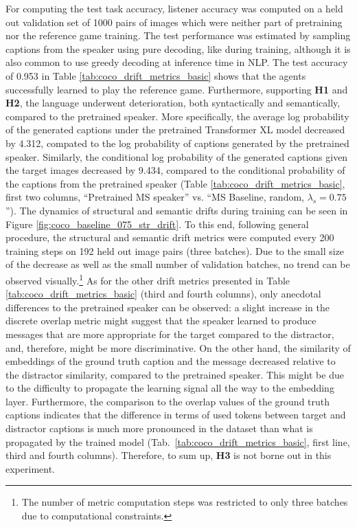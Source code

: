 For computing the test task accuracy, listener accuracy was computed on a held out validation set of 1000 pairs of images which were neither part of pretraining nor the reference game training. The test performance was estimated by sampling captions from the speaker using pure decoding, like during training, although it is also common to use greedy decoding at inference time in NLP. The test accuracy of 0.953 in Table \ref{tab:coco_drift_metrics_basic} shows that the agents successfully learned to play the reference game. Furthermore, supporting \textbf{H1} and \textbf{H2}, the language underwent deterioration, both syntactically and semantically, compared to the pretrained speaker. More specifically, the average log probability of the generated captions under the pretrained Transformer XL model decreased by 4.312, compated to the log probability of captions generated by the pretrained speaker. Similarly, the conditional log probability of the generated captions given the target images decreased by 9.434, compared to the conditional probability of the captions from the pretrained speaker (Table \ref{tab:coco_drift_metrics_basic}, first two columns, ``Pretrained MS speaker'' vs. ``MS Baseline, random, $\lambda_s=0.75$''). The dynamics of structural and semantic drifts during training can be seen in Figure \ref{fig:coco_baseline_075_str_drift}. To this end, following general procedure, the structural and semantic drift metrics were computed every 200 training steps on 192 held out image pairs (three batches). Due to the small size of the decrease as well as the small number of validation batches, no trend can be observed visually.\footnote{The number of metric computation steps was restricted to only three batches due to computational constraints.} 
As for the other drift metrics presented in Table \ref{tab:coco_drift_metrics_basic} (third and fourth columns), only anecdotal differences to the pretrained speaker can be observed: a slight increase in the discrete overlap metric might suggest that the speaker learned to produce messages that are more appropriate for the target compared to the distractor, and, therefore, might be more discriminative. On the other hand, the similarity of embeddings of the ground truth caption and the message decreased relative to the distractor similarity, compared to the pretrained speaker. This might be due to the difficulty to propagate the learning signal all the way to the embedding layer. Furthermore, the comparison to the overlap values of the ground truth captions indicates that the difference in terms of used tokens between target and distractor captions is much more pronounced in the dataset than what is propagated by the trained model (Tab.~\ref{tab:coco_drift_metrics_basic}, first line, third and fourth columns).  
Therefore, to sum up, \textbf{H3} is not borne out in this experiment.

